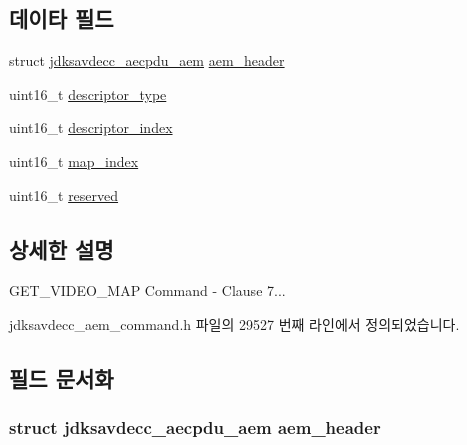 \subsection*{데이타 필드}
\begin{DoxyCompactItemize}
\item 
struct \hyperlink{structjdksavdecc__aecpdu__aem}{jdksavdecc\+\_\+aecpdu\+\_\+aem} \hyperlink{structjdksavdecc__aem__command__get__video__map_ae1e77ccb75ff5021ad923221eab38294}{aem\+\_\+header}
\item 
uint16\+\_\+t \hyperlink{structjdksavdecc__aem__command__get__video__map_ab7c32b6c7131c13d4ea3b7ee2f09b78d}{descriptor\+\_\+type}
\item 
uint16\+\_\+t \hyperlink{structjdksavdecc__aem__command__get__video__map_a042bbc76d835b82d27c1932431ee38d4}{descriptor\+\_\+index}
\item 
uint16\+\_\+t \hyperlink{structjdksavdecc__aem__command__get__video__map_a3a5e0547986898ad64c07f238d8b7bcf}{map\+\_\+index}
\item 
uint16\+\_\+t \hyperlink{structjdksavdecc__aem__command__get__video__map_a5a6ed8c04a3db86066924b1a1bf4dad3}{reserved}
\end{DoxyCompactItemize}


\subsection{상세한 설명}
G\+E\+T\+\_\+\+V\+I\+D\+E\+O\+\_\+\+M\+AP Command -\/ Clause 7... 

jdksavdecc\+\_\+aem\+\_\+command.\+h 파일의 29527 번째 라인에서 정의되었습니다.



\subsection{필드 문서화}
\subsubsection[{\texorpdfstring{aem\+\_\+header}{aem_header}}]{\setlength{\rightskip}{0pt plus 5cm}struct {\bf jdksavdecc\+\_\+aecpdu\+\_\+aem} aem\+\_\+header}\hypertarget{structjdksavdecc__aem__command__get__video__map_ae1e77ccb75ff5021ad923221eab38294}{}\label{structjdksavdecc__aem__command__get__video__map_ae1e77ccb75ff5021ad923221eab38294}



